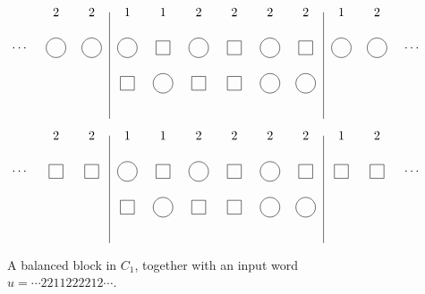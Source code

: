 \documentclass[submission]{FPSAC2018}
\newcommand{\0}{\phantom{c}}
\theoremstyle{plain}
\theoremstyle{definition}
\numberwithin{equation}{section}
\begin{document}
\begin{figure}
\[
\begin{tikzpicture}
\draw (-0.5,6)--(-0.5,3);
\draw (5.5,6)--(5.5,3);
  \node at(-2,6){2};
  \node at(-1,6){2};
  \node at (0,6){1};
  \node at (1,6){1};
  \node at (2,6){2};
  \node at (3,6){2};
  \node at (4,6){2};
  \node at (5,6){2};
  \node at (6,6){1};
  \node at (7,6){2};
  \node[circle,draw=black] at (0, 5){\0};
  \node[rectangle,draw=black] at (1, 5){\0};
  \node[circle,draw=black] at (2, 5){\0};
  \node[rectangle, draw=black] at (3, 5){\0};
  \node[circle,draw=black] at (4, 5){\0};
  \node[rectangle,draw=black] at (5, 5){\0};
  \node[rectangle,draw=black] at (0, 4){\0};
  \node[circle, draw=black] at (1, 4){\0};
  \node[rectangle,draw=black] at (2, 4){\0};
  \node[rectangle,draw=black] at (3, 4){\0};
  \node[circle,draw=black] at (4, 4){\0};
  \node[circle, draw=black] at (5, 4){\0};
  \node[circle,draw=black] at (-1, 5){\0};
  \node[circle,draw=black] at (-2, 5){\0};
  \node at (-3,5){\dots};
  \node[circle,draw=black] at (6, 5){\0};
  \node[circle,draw=black] at (7, 5){\0};
  \node at (8,5){\dots};
\end{tikzpicture}
\]
\[
\begin{tikzpicture}
  \node at(-2,6){2};
  \node at(-1,6){2};
  \node at (0,6){1};
  \node at (1,6){1};
  \node at (2,6){2};
  \node at (3,6){2};
  \node at (4,6){2};
  \node at (5,6){2};
  \node at (6,6){1};
  \node at (7,6){2};

\draw (-0.5,6)--(-0.5,3);
\draw (5.5,6)--(5.5,3);
  \node[circle,draw=black] at (0, 5){\0};
  \node[rectangle,draw=black] at (1, 5){\0};
  \node[circle,draw=black] at (2, 5){\0};
  \node[rectangle, draw=black] at (3, 5){\0};
  \node[circle,draw=black] at (4, 5){\0};
  \node[rectangle,draw=black] at (5, 5){\0};

  \node[rectangle,draw=black] at (0, 4){\0};
  \node[circle, draw=black] at (1, 4){\0};
  \node[rectangle,draw=black] at (2, 4){\0};
  \node[rectangle,draw=black] at (3, 4){\0};
  \node[circle,draw=black] at (4, 4){\0};
  \node[circle, draw=black] at (5, 4){\0};
  
  \node[rectangle,draw=black] at (-1, 5){\0};
  \node[rectangle,draw=black] at (-2, 5){\0};
  \node at (-3,5){$\dotsm$};

  \node[rectangle,draw=black] at (6, 5){\0};
  \node[rectangle,draw=black] at (7, 5){\0};
  \node at (8,5){$\dotsm$};
\end{tikzpicture}
\]
\caption{A balanced block in $C_1$, together with an input word $u = \dotsm 2211222212 \dotsm$.}
\end{figure}
\end{document}
